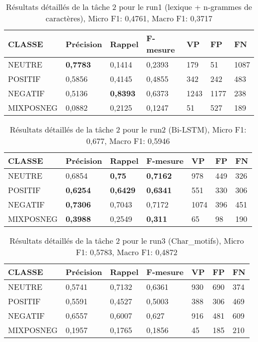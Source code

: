 

\begin{table}[htbp]
  \begin{center}
\begin{tabular}{l|l|l|l|l|l|l}
  CLASSE	&Précision	&Rappel	&F-mesure	&VP	&FP	&FN\\
\hline
\hline
  NEUTRE	&\textbf{0,7783}	&0,1414	&0,2393	&179	&51	&1087\\
  POSITIF	&0,5856	&0,4145	&0,4855	&342	&242	&483\\
  NEGATIF	&0,5136	&\textbf{0,8393}	&0,6373	&1243	&1177	&238\\
  MIXPOSNEG	&0,0882	&0,2125	&0,1247	&51	&527	&189\\
\hline
\end{tabular}
\caption{Résultats détaillés de la tâche 2 pour le run1 (lexique + n-grammes de caractères),
  Micro F1: 0,4761, Macro F1: 0,3717\label{tab:detail1}}
\end{center}
\end{table}



\begin{table}[htbp]
  \begin{center}
\begin{tabular}{l|l|l|l|l|l|l}
  CLASSE	&Précision	&Rappel	&F-mesure	&VP	&FP	&FN\\
\hline
\hline
  NEUTRE	&0,6854	&\textbf{0,75}	&\textbf{0,7162}	&978	&449	&326\\
  POSITIF	&\textbf{0,6254}	&\textbf{0,6429}	&\textbf{0,6341}	&551	&330	&306\\
  NEGATIF	&\textbf{0,7306}	&0,7043	&0,7172	&1074	&396	&451\\
  MIXPOSNEG	&\textbf{0,3988}	&0,2549	&\textbf{0,311}	&65	&98	&190\\
\hline
\end{tabular}
\caption{Résultats détaillés de la tâche 2 pour le run2 (Bi-LSTM),
  Micro F1: 0,677, Macro F1: 0,5946\label{tab:detail2}}
\end{center}
\end{table}



\begin{table}[htbp]
  \begin{center}
    \begin{tabular}{l|l|l|l|l|l|l}
  CLASSE	&Précision	&Rappel	&F-mesure	&VP	&FP	&FN\\
\hline
\hline
  NEUTRE	&0,5741	&0,7132	&0,6361	&930	&690	&374\\
  POSITIF	&0,5591	&0,4527	&0,5003	&388	&306	&469\\
  NEGATIF	&0,6557	&0,6007	&0,627	&916	&481	&609\\
  MIXPOSNEG	&0,1957	&0,1765	&0,1856	&45	&185	&210\\
\hline
\end{tabular}
\caption{Résultats détaillés de la tâche 2 pour le run3 (Char\_motifs),
  Micro F1: 0,5783, Macro F1: 0,4872\label{tab:detail3}}
\end{center}
\end{table}



